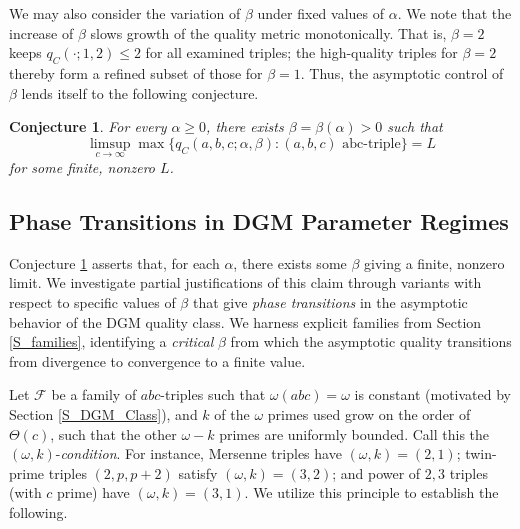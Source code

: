 \documentclass[11pt,letterpaper]{amsart}
\newtheorem{conjecture}[theorem]{Conjecture}
\begin{document}
We may also consider the variation of $\beta$ under fixed values of $\alpha$. We note that the increase of $\beta$ slows growth of the quality metric monotonically. That is, $\beta=2$ keeps $q_C(\cdot;1,2)\le 2$ for all examined triples; the high-quality triples for $\beta=2$ thereby form a refined subset of those for $\beta=1$. Thus, the asymptotic control of $\beta$ lends itself to the following conjecture.

\begin{conjecture}\label{Smooth_class_ABC_Analogue}
For every $\alpha\ge 0$, there exists $\beta=\beta(\alpha)>0$ such that
\[
\limsup_{c\to\infty}\max\{q_C(a,b,c;\alpha,\beta):(a,b,c)\text{ abc-triple}\}=L
\]
for some finite, nonzero $L$.
\end{conjecture}

\subsection{Phase Transitions in DGM Parameter Regimes}
\label{S_pt}
Conjecture \ref{Smooth_class_ABC_Analogue} asserts that, for each $\alpha$, there exists some $\beta$ giving a finite, nonzero limit. We investigate partial justifications of this claim through variants with respect to specific values of $\beta$ that give \textit{phase transitions} in the asymptotic behavior of the DGM quality class. We harness explicit families from Section \ref{S_families}, identifying a \textit{critical} $\beta$ from which the asymptotic quality transitions from divergence to convergence to a finite value.

Let $\mathcal{F}$ be a family of $abc$-triples such that $\omega(abc)=\omega$ is constant (motivated by Section \ref{S_DGM_Class}), and $k$ of the $\omega$ primes used grow on the order of $\Theta(c)$, such that the other $\omega-k$ primes are uniformly bounded. Call this the $(\omega,k)$-\textit{condition}. For instance, Mersenne triples have $(\omega,k)=(2,1)$; twin-prime triples $(2,p,p+2)$ satisfy $(\omega, k) = (3,2)$; and power of $2,3$ triples (with $c$ prime) have $(\omega, k) = (3,1)$. We utilize this principle to establish the following.
\end{document}
